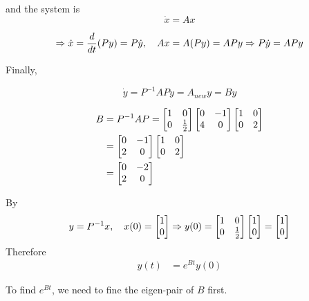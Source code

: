 \documentclass[12pt,a4paper]{article}
\begin{document}
and the system is 
\[
\dot x = Ax 
\]


\[
\Rightarrow \dot x  = {d\over dt} (Py) = P\dot y, \quad Ax = A(Py) = APy \Rightarrow P\dot y = APy
\]

Finally, 

\[
\dot y = P^{-1}AP y = A_{new} y = B y
\]

\begin{align*}
	B &= P^{-1}AP = \begin{bmatrix}
		1 & 0 \\
		0 & {1\over2}
	\end{bmatrix}\begin{bmatrix}
	0 & -1 \\ 4 & 0
	\end{bmatrix}\begin{bmatrix}
	1 & 0 \\ 0 & 2
	\end{bmatrix} \\
	&= \begin{bmatrix}
		0 & -1 \\
		2 & 0
	\end{bmatrix}\begin{bmatrix}
	1 & 0 \\ 0 & 2
	\end{bmatrix} \\
	&=\begin{bmatrix}
		0 & -2 \\
		2 & 0
	\end{bmatrix}
\end{align*}

By
\[
y = P^{-1} x , \quad x(0) = \begin{bmatrix}
	1 \\ 0
\end{bmatrix} \Rightarrow y(0) = \begin{bmatrix}
1 & 0 \\ 0 & {1\over2} 
\end{bmatrix} \begin{bmatrix}
1 \\ 0
\end{bmatrix} = \begin{bmatrix}
1 \\ 0
\end{bmatrix}
\]
Therefore
\begin{align*}
	y(t) &= e^{Bt}y(0) 
\end{align*}

To find $e^{Bt}$, we need to fine the eigen-pair of $B$ first.
\end{document}
